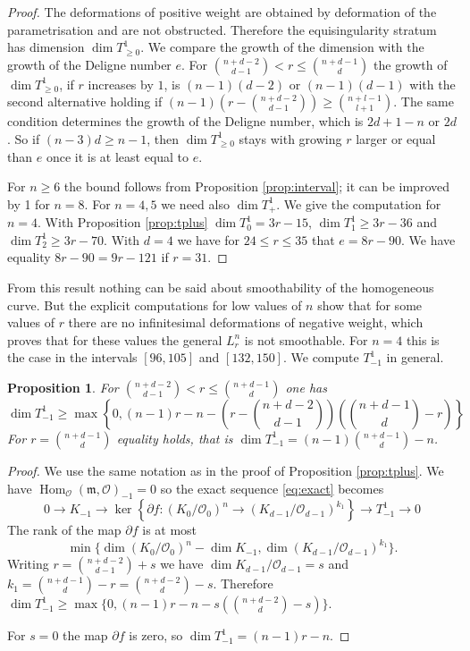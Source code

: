 \documentclass{amsart}
\newcommand {\m}{\mathfrak{m}}
\DeclareMathOperator{\Hom}{Hom}
\renewcommand{\ell}{l}
\newcommand{\mO}{\mathcal{O}}
\newtheorem{prop}[thm]{Proposition}
\theoremstyle{definition}
\theoremstyle{remark}
\begin{document}
 
\begin{proof}
The deformations of positive weight are obtained 
by deformation of the parametrisation and are not obstructed. Therefore the
equisingularity stratum has dimension $\dim T^1_{\geq0}$.  We compare the growth of the dimension
with the growth of the Deligne number $e$. For $\binom{n+d-2}{d-1} <r \leq \binom{n+d-1}{d}$
the growth of $\dim T^1_{\geq0}$, if $r$ increases by $1$, is $(n-1)(d-2)$ or $(n-1)(d-1)$ with
the second alternative holding  if $(n-1)\left(r-\binom{n+d-2}{d-1}\right)\geq \binom{n+\ell-1}{\ell+1}$.
The same condition determines the growth of the Deligne number, which is
$2d+1-n$ or $2d$.  So if $(n-3)d\geq n-1$, then $\dim T^1_{\geq0}$ stays with growing $r$
larger or equal than $e$ once it is at least equal to $e$.

For $n\geq 6$ the bound follows from Proposition \ref{prop:interval}; it can be improved by 1 for $n=8$.
For $n=4,5$ we need also $\dim T^1_+$. We give the computation for $n=4$. 
With Proposition \ref{prop:tplus} $\dim T^1_0= 3r-15$, $\dim T^1_1\geq  3r-36$ and $\dim T^1_2\geq 3r-70$.
With $d=4$ we have for  $24\leq r \leq 35$  that $e=8r-90$.
We have equality $8r-90=9r-121$ if $r=31$.
\end{proof}


From this result nothing can be said about smoothability of the homogeneous curve.
But the explicit computations for low values of $n$ show that for some values of $r$ there
are no infinitesimal deformations of negative weight, which proves that for these values the general $L_r^n$ is not smoothable.  For $n=4$ this is the case in the 
intervals $[96,105]$ and $[132,150]$. We compute $T^1_{-1}$ in general.


\begin{prop}\label{prop:tmineen}
For $\binom{n+d-2}{d-1} <r \leq \binom{n+d-1}{d}$ one has 
\[\textstyle
\dim T^1_{-1}\geq \max\left\{0, (n-1)r-n-\left(r-\binom{n+d-2}{d-1}\right)\left(\binom{n+d-1}{d}-r\right)\right\}\] For $r=\binom{n+d-1}{d}$  equality holds, that is $\dim T^1_{-1}=(n-1)\binom{n+d-1}{d}-n$.
 \end{prop}

\begin{proof}
We use  the same notation as in the proof of Proposition \ref{prop:tplus}. 
We have $\Hom_\mO(\m,\mO)_{-1}=0$
so the exact sequence \eqref{eq:exact} becomes
\[
0\to K_{-1} \to 
\ker \left  \{%
{\partial f}\colon (K_{0}/\mO_{0})^n\to (K_{d-1}/\mO_{d-1})^{k_1}\right\} \to
T^1_{-1}\to 0
\]
The rank of the map $%
{\partial f}$ is at most
\[
\min \{\dim  (K_{0}/\mO_{0})^n- \dim K_{-1}, \dim  (K_{d-1}/\mO_{d-1})^{k_1}\}.
\]
Writing $r=\binom{n+d-2}{d-1}+s$ we have  $\dim  K_{d-1}/\mO_{d-1}=s$ and 
 $k_1= \binom{n+d-1}{d}-r= \binom{n+d-2}{d}-s$.
Therefore  $\dim T^1_{-1}\geq \max\{0, (n-1)r-n-s(\binom{n+d-2}{d}-s)\}$.

For $s=0$ the map $%
{\partial f}$ is zero, so $\dim T^1_{-1}=(n-1)r-n$.
\end{proof}
\end{document}
